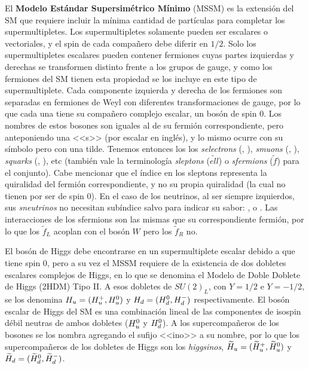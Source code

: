 El \textbf{Modelo Estándar Supersimétrico Mínimo} (MSSM) es la extensión del SM que requiere incluir la mínima cantidad de partículas para completar los supermultipletes. Los supermultipletes solamente pueden ser escalares o vectoriales, y el spin de cada compañero debe diferir en $1/2$. Solo los supermultipletes escalares pueden contener fermiones cuyas partes izquierdas y derechas se transformen distinto frente a los grupos de gauge, y como los fermiones del SM tienen esta propiedad se los incluye en este tipo de supermultiplete. Cada componente izquierda y derecha de los fermiones son separadas en fermiones de Weyl con diferentes transformaciones de gauge, por lo que cada una tiene su compañero complejo escalar, un bosón de spin 0. Los nombres de estos bosones son iguales al de su fermión correspondiente, pero anteponiendo una <<s>> (por escalar en inglés), y lo mismo ocurre con su símbolo pero con una tilde. Tenemos entonces los los \textit{selectrons} (\selL, \selR), \textit{smuons} (\smuL, \smuR), \textit{squarks} (\squarkL, \squarkR), etc (también vale la terminología \textit{sleptons} ($\tilde{ell}$) o \textit{sfermions} ($\tilde{f}$) para el conjunto). Cabe mencionar que el índice en los sleptons representa la quiralidad del fermión correspondiente, y no su propia quiralidad (la cual no tienen por ser de spin 0). En el caso de los neutrinos, al ser siempre izquierdos, sus \textit{sneutrinos} no necesitan subíndice salvo para indicar su sabor: \snue, \snumu o \snutau. Las interacciones de los sfermions son las mismas que su correspondiente fermión, por lo que los $\tilde{f}_L$ acoplan con el bosón $W$ pero los $\tilde{f}_R$ no.

El bosón de Higgs debe encontrarse en un supermultiplete escalar debido a que tiene spin 0, pero a su vez el MSSM requiere de la existencia de dos dobletes escalares complejos de Higgs, en lo que se denomina el Modelo de Doble Doblete de Higgs (2HDM) Tipo II. A esos dobletes de $SU(2)_L$, con $Y=1/2$ e $Y=-1/2$, se los denomina $H_u=(H_u^+, H_u^0)$ y $H_d=(H_d^0, H_d^-)$ respectivamente. El bosón escalar de Higgs del SM es una combinación lineal de las componentes de isospin débil neutras de ambos dobletes ($H_u^0$ y $H_d^0$). A los supercompañeros de los bosones se los nombra agregando el sufijo <<ino>> a su nombre, por lo que los supercompañeros de los dobletes de Higgs son los \textit{higgsinos}, $\widetilde{H}_u=(\widetilde{H}_u^+, \widetilde{H}_u^0)$ y $\widetilde{H}_d=(\widetilde{H}_d^0, \widetilde{H}_d^-)$.

